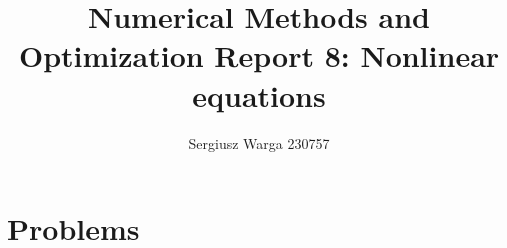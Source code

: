 \documentclass[a4paper]{article}
\title{Numerical Methods and Optimization Report 8:
  Nonlinear equations}
\author{Sergiusz Warga 230757}
\date{}
\begin{document}
\maketitle
\tableofcontents
\pagebreak

\section{Problems}




\clearpage

\nocite{Meyer, GoluVanl96, Zdunek, NoceWrig99}


\end{document}
